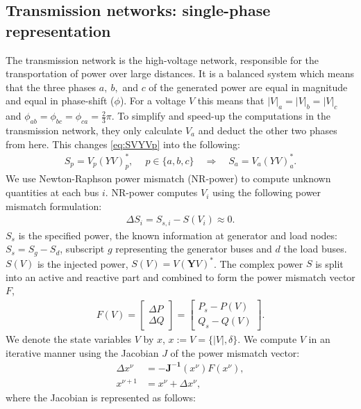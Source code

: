 \documentclass[10pt,journal]{article}
\begin{document}
\subsection{Transmission networks: single-phase representation}
The transmission network is the high-voltage network, responsible for the transportation of power over large distances. It is a balanced system which means that the three phases $a,\ b,$ and $c$ of the generated power are equal in magnitude and equal in phase-shift ($\phi$). For a voltage $V$ this means that $|V|_a=|V|_b=|V|_c$ and $\phi_{ab}=\phi_{bc}=\phi_{ca}=\frac{2}{3}\pi$. 
To simplify and speed-up the computations in the transmission network, they only calculate $V_a$ and deduct the other two phases from here. This changes \eqref{eq:SVYVp} into the following: 
\begin{align}
    S_p=V_p(YV)_p^*,\quad\ p\in\{a,b,c\}\quad \Rightarrow \quad S_a=V_a(YV)_a^*
    \label{eq:SVYVa}.
\end{align}
We use Newton-Raphson power mismatch (NR-power) to compute unknown quantities at each bus $i$. NR-power computes $V_i$ using the following power mismatch formulation:
\begin{align}
    \Delta S_i = S_{s,i} - S(V_i) \approx 0.
\end{align}
$S_s$ is the specified power, the known information at generator and load nodes: $S_s=S_g-S_d$, subscript $g$ representing the generator buses and $d$ the load buses. $S(V)$ is the injected power, $S(V)=V({\mathbf{Y}V})^*$. 
The complex power $S$ is split into an active and reactive part and combined to form the power mismatch vector $F$, 
\begin{align}
     F(V)=\begin{bmatrix}
                \Delta {P}\\ \Delta {Q}
               \end{bmatrix}  = \begin{bmatrix}
               {P}_s-{P}(V) \\ {Q}_s-{Q}(V)
               \end{bmatrix}.
    \label{eq:powmism}
\end{align}
We denote the state variables $V$ by $x$, $x:=V=\{|V|,\delta\}$. We compute $V$ in an iterative manner using the Jacobian $J$ of the power mismatch vector: 
\begin{align}
  {\Delta x^\nu} &= \mathbf{-J^{-1}}(x^\nu )F(x^\nu),\\
  {x^{\nu +1}} &= {x^\nu + \Delta x^\nu}, 
  \end{align}  where the Jacobian is represented as follows: 
\end{document}
